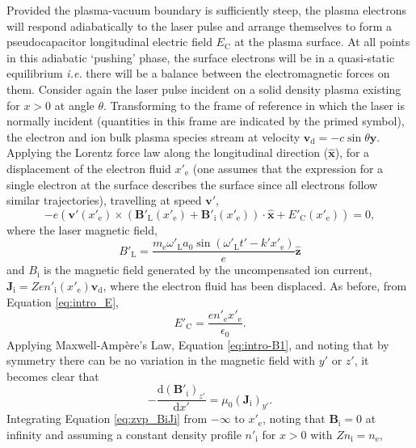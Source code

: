 Provided the plasma-vacuum boundary is sufficiently steep, the plasma electrons will respond adiabatically to the laser pulse and arrange themselves to form a pseudocapacitor longitudinal electric field $E_\mathrm{C}$ at the plasma surface. At all points in this adiabatic `pushing' phase, the surface electrons will be in a quasi-static equilibrium \textit{i.e.} there will be a balance between the electromagnetic forces on them. Consider again the laser pulse incident on a solid density plasma existing for $x>0$ at angle $\theta$. Transforming to the frame of reference in which the laser is normally incident (quantities in this frame are indicated by the primed symbol), the electron and ion bulk plasma species stream at velocity $\mathbf{v}_\mathrm{d} = -c \sin\theta \hat{\mathbf{y}}$.  Applying the Lorentz force law along the longitudinal direction ($\hat{\mathbf{x}}$), for a displacement of the electron fluid $x'_\mathrm{e}$ (one assumes that the expression for a single electron at the surface describes the surface since all electrons follow similar trajectories), travelling at speed $\mathbf{v'}$,
\begin{equation}\label{eq:zvp_eq}
	-e(\mathbf{v'}(x'_\mathrm{e})\times (\mathbf{B}'_\mathrm{L}(x'_\mathrm{e}) + \mathbf{B}'_\mathrm{i}(x'_\mathrm{e}))\cdot \hat{\mathbf{x}} + E'_\mathrm{C}(x'_\mathrm{e}) )= 0,
\end{equation}
where the laser magnetic field,
\begin{equation}\label{eq:zvp_Bl}
	B'_\mathrm{L} = \frac{m_\mathrm{e} \omega'_\mathrm{L}a_0\sin(\omega'_\mathrm{L}t'-k'x'_\mathrm{e})}{e} \hat{\mathbf{z}}
\end{equation}
and $B_\mathrm{i}$ is the magnetic field generated by the uncompensated ion current, $\mathbf{J_\mathrm{i}} =  Zen'_\mathrm{i}(x'_\mathrm{e}) \mathbf{v}_\mathrm{d}$, where the electron fluid has been displaced. As before, from Equation \ref{eq:intro_E},
\begin{equation}\label{eq:zvp_Ec}
	E'_\mathrm{C} = \frac{en'_\mathrm{e}x'_\mathrm{e}}{\epsilon_0}.
\end{equation}
Applying Maxwell-Ampère's Law, Equation \ref{eq:intro-B1}, and noting that by symmetry there can be no variation in the magnetic field with $y'$ or $z'$, it becomes clear that
\begin{equation}\label{eq:zvp_BiJi}
	-\frac{\mathrm{d}(\mathbf{B}'_\mathrm{i})_{z'}}{\mathrm{d} x'} = \mu_0 (\mathbf{J}_\mathrm{i})_{y'}.
\end{equation}
Integrating Equation \ref{eq:zvp_BiJi} from $-\infty$ to $x'_\mathrm{e}$, noting that $\mathbf{B}_\mathrm{i} = 0$ at infinity and assuming a constant density profile $n'_\mathrm{i}$ for $x>0$ with $Zn_\mathrm{i} = n_\mathrm{e}$,
